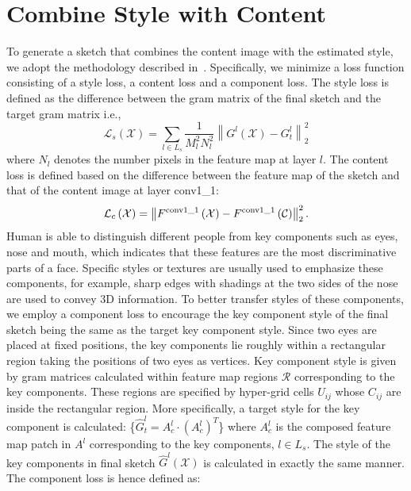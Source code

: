\documentclass[10pt,twocolumn,letterpaper]{article}
\begin{document}
{
\section{Combine Style with Content}
}
To generate a sketch that combines the content image with the estimated style, we adopt the methodology described in~\cite{gatys2015texture}. Specifically, we minimize a loss function consisting of a style loss, a content loss and a component loss. The style loss is defined as the difference between the gram matrix of the final sketch and the target gram matrix i.e.,
\begin{equation}
\mathcal{L}_{s} \left( \mathcal{X} \right) = \sum\limits_{l \in {L_s}} {\frac{1}{{M_l^2N_l^2}}\left\| {{G^l}\left( \mathcal{X} \right) - G_t^l} \right\|_2^2} 
\label{eq:Gram_loss}
\end{equation}
where $N_l$ denotes the number pixels in the feature map at layer $l$. The content loss is defined based on the difference between the feature map of the sketch and that of the content image at layer conv1\_1:
\begin{equation}
\mathcal{L}_{c}\left( \mathcal{X} \right) = \left\| {{F^{\rm{conv1\_1}}}\left( \mathcal{X} \right) - {F^{\rm{conv1\_1}}}\left( \mathcal{C} \right)} \right\|_2^2.
\label{eq:Style_loss}
\end{equation}
Human is able to distinguish different people from key components such as eyes, nose and mouth, which indicates that these features are the most discriminative parts of a face. Specific styles or textures are usually used to emphasize these components, for example, sharp edges with shadings at the two sides of the nose are used to convey 3D information. To better transfer styles of these components, we employ a component loss to encourage the key component style of the final sketch being the same as the target key component style. Since two eyes are placed at fixed positions, the key components lie roughly within a rectangular region taking the positions of two eyes as vertices. Key component style is given by gram matrices calculated within feature map regions $\mathcal R$ corresponding to the key components. These regions are specified by hyper-grid cells $U_{ij}$ whose $C_{ij}$ are inside the rectangular region. More specifically, a target style for the key component is calculated: \{${\hat G}_{t}^l ={A}_{c}^l \cdot {\left( {{{A}_{c}^l}} \right)^T}$\} where ${A}_{c}^l$ is the composed feature map patch in $A^{l}$ corresponding to the key components, $l\in L_s$. The style of the key components in final sketch ${\hat G}^l\left( \mathcal{X} \right) $ is calculated in exactly the same manner. The component loss is hence defined as:
\end{document}
